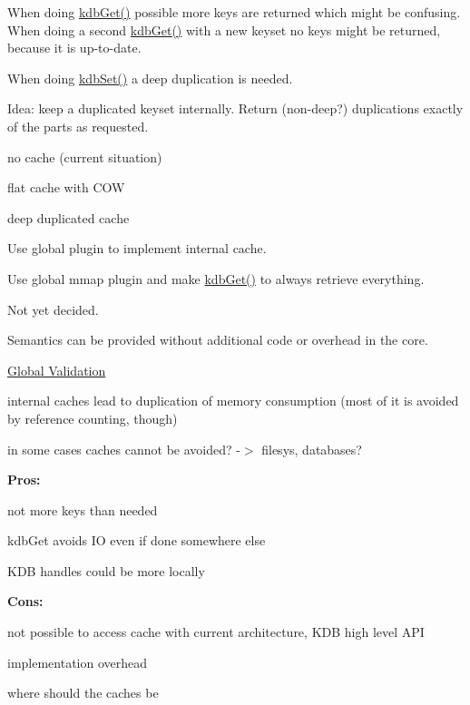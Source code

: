 When doing \hyperlink{group__kdb_ga28e385fd9cb7ccfe0b2f1ed2f62453a1}{kdb\+Get()} possible more keys are returned which might be confusing. When doing a second \hyperlink{group__kdb_ga28e385fd9cb7ccfe0b2f1ed2f62453a1}{kdb\+Get()} with a new keyset no keys might be returned, because it is up-\/to-\/date.

When doing \hyperlink{group__kdb_ga11436b058408f83d303ca5e996832bcf}{kdb\+Set()} a deep duplication is needed.

Idea\+: keep a duplicated keyset internally. Return (non-\/deep?) duplications exactly of the parts as requested.


\begin{DoxyItemize}
\item no cache (current situation)
\item flat cache with C\+OW
\item deep duplicated cache
\item Use global plugin to implement internal cache.
\item Use global mmap plugin and make \hyperlink{group__kdb_ga28e385fd9cb7ccfe0b2f1ed2f62453a1}{kdb\+Get()} to always retrieve everything.
\end{DoxyItemize}

Not yet decided.

Semantics can be provided without additional code or overhead in the core.


\begin{DoxyItemize}
\item \hyperlink{doc_decisions_global_validation_md}{Global Validation}
\end{DoxyItemize}

internal caches lead to duplication of memory consumption (most of it is avoided by reference counting, though)

in some cases caches cannot be avoided? -\/$>$ filesys, databases?

{\bfseries Pros\+:}


\begin{DoxyItemize}
\item not more keys than needed
\item kdb\+Get avoids IO even if done somewhere else
\item K\+DB handles could be more locally
\end{DoxyItemize}

{\bfseries Cons\+:}


\begin{DoxyItemize}
\item not possible to access cache with current architecture, K\+DB high level A\+PI
\item implementation overhead
\item where should the caches be 
\end{DoxyItemize}